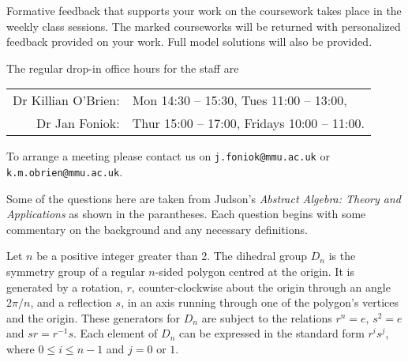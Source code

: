 \documentclass[oneside,10pt]{amsart}
\begin{document}
Formative feedback that supports your work on the coursework takes place in the weekly class sessions. The marked courseworks will be returned with personalized feedback provided on your work. Full model solutions will also be provided.

The regular drop-in office hours for the staff are
\begin{center}
\begin{tabular}{rl}
Dr Killian O'Brien:  & Mon 14:30 -- 15:30, Tues 11:00 -- 13:00,\\
Dr Jan Foniok:  & Thur 15:00 -- 17:00, Fridays 10:00 -- 11:00.
\end{tabular}
\end{center}

To arrange a meeting please contact us on \texttt{j.foniok@mmu.ac.uk} or \texttt{k.m.obrien@mmu.ac.uk}.

Some of the questions here are taken from Judson's \textit{Abstract Algebra: Theory and Applications} as shown in the parantheses. Each question begins with some commentary on the background and any necessary definitions.

Let $n$ be a positive integer greater than 2. The dihedral group $D_n$ is the symmetry group of a regular $n$-sided polygon centred at the origin. It is generated by a rotation, $r$, counter-clockwise about the origin through an angle $2\pi/n$, and a reflection $s$, in an axis running through one of the polygon's vertices and the origin. These generators for $D_n$ are subject to the relations $r^n = e$, $s^2 = e$ and $sr = r^{-1}s$. Each element of $D_n$ can be expressed in the standard form $r^i s^j$, where $0 \leq i \leq n-1$ and $j=0$ or $1$.
\end{document}
